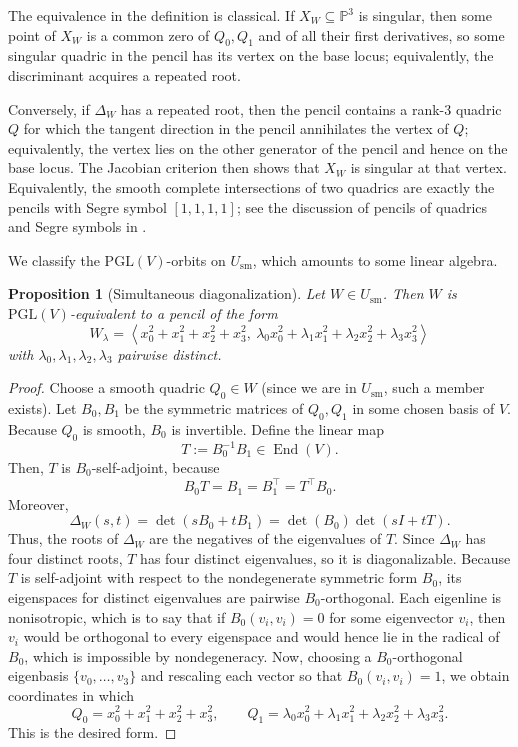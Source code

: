 \documentclass[11pt]{article}
\newtheorem{proposition}[theorem]{Proposition}
\newcommand{\Pj}{\mathbb P}
\newcommand{\PGL}{\mathrm{PGL}}
\begin{document}
The equivalence in the definition is classical. If $X_W\subseteq \Pj^3$ is singular, then some point of $X_W$ is a common zero of $Q_0,Q_1$ and of all their first derivatives, so some singular quadric in the pencil has its vertex on the base locus; equivalently, the discriminant acquires a repeated root. 

Conversely, if $\Delta_W$ has a repeated root, then the pencil contains a rank-$3$ quadric $Q$ for which the tangent direction in the pencil annihilates the vertex of $Q$; equivalently, the vertex lies on the other generator of the pencil and hence on the base locus. The Jacobian criterion then shows that $X_W$ is singular at that vertex. Equivalently, the smooth complete intersections of two quadrics are exactly the pencils with Segre symbol $[1,1,1,1]$; see the discussion of pencils of quadrics and Segre symbols in \cite{Dolgachev}.

We classify the $\PGL(V)$-orbits on $U_{\mathrm{sm}}$, which amounts to some linear algebra. 

\begin{proposition}[Simultaneous diagonalization]\label{prop:diag}
Let $W\in U_{\mathrm{sm}}$. Then $W$ is $\PGL(V)$-equivalent to a pencil of the form
\[
W_\lambda=
\left \langle
x_0^2+x_1^2+x_2^2+x_3^2,\
\lambda_0x_0^2+\lambda_1x_1^2+\lambda_2x_2^2+\lambda_3x_3^2
\right\rangle
\]
with $\lambda_0,\lambda_1,\lambda_2,\lambda_3$ pairwise distinct.
\end{proposition}

\begin{proof}
Choose a smooth quadric $Q_0\in W$ (since we are in $U_{\mathrm{sm}}$, such a member exists). Let $B_0,B_1$ be the symmetric matrices of $Q_0,Q_1$ in some chosen basis of $V$. Because $Q_0$ is smooth, $B_0$ is invertible. Define the linear map
\[
T:=B_0^{-1}B_1\in \operatorname{End}(V).
\]
Then, $T$ is $B_0$-self-adjoint, because
\[
B_0T=B_1=B_1^\top=T^\top B_0.
\]
Moreover,
\[
\Delta_W(s,t)=\det(sB_0+tB_1)=\det(B_0)\det(sI+tT).
\]
Thus, the roots of $\Delta_W$ are the negatives of the eigenvalues of $T$. Since $\Delta_W$ has four distinct roots, $T$ has four distinct eigenvalues, so it is diagonalizable. Because $T$ is self-adjoint with respect to the nondegenerate symmetric form $B_0$, its eigenspaces for distinct eigenvalues are pairwise $B_0$-orthogonal. Each eigenline is nonisotropic, which is to say that if $B_0(v_i,v_i)=0$ for some eigenvector $v_i$, then $v_i$ would be orthogonal to every eigenspace and would hence lie in the radical of $B_0$, which is impossible by nondegeneracy. Now, choosing a $B_0$-orthogonal eigenbasis $\{v_0,\dots,v_3\}$ and rescaling each vector so that $B_0(v_i,v_i)=1$, we obtain coordinates in which
\[
Q_0=x_0^2+x_1^2+x_2^2+x_3^2,
\qquad
Q_1=\lambda_0x_0^2+\lambda_1x_1^2+\lambda_2x_2^2+\lambda_3x_3^2.
\]
This is the desired form.
\end{proof}
\end{document}
